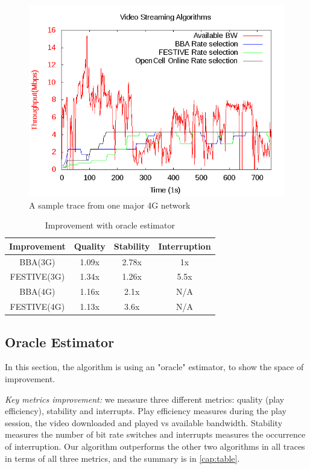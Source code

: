 \begin{figure}[t]
 \includegraphics[width=\linewidth]{pictures/ATT.png}
 \caption{A sample trace from one major 4G network}
\end{figure}

\begin{table}[t]

\begin{tabular} {|c |c |c |c |}
\hline
 Improvement &Quality &Stability & Interruption\\ \hline
BBA(3G)  & 1.09x& 2.78x& 1x \\ \hline
FESTIVE(3G)    & 1.34x & 1.26x&5.5x\\ \hline
BBA(4G) & 1.16x& 2.1x& N/A \\ \hline
FESTIVE(4G) & 1.13x& 3.6x& N/A \\ \hline
\end{tabular}
\centering
\caption{Improvement with oracle estimator} \label{cap:table}
\end{table}


\subsection{Oracle Estimator}\label{sub:oracle}
In this section, the algorithm is using an "oracle" estimator, to show the space of improvement.

\emph{Key metrics improvement:} we measure three different metrics: quality (play efficiency), stability and interrupts. Play efficiency measures during the play session, the video downloaded and played vs available bandwidth. Stability measures the number of bit rate switches and interrupts measures the occurrence of interruption. Our algorithm outperforms the other two algorithms in all traces in terms of all three metrics, and the summary is in \autoref{cap:table}.

